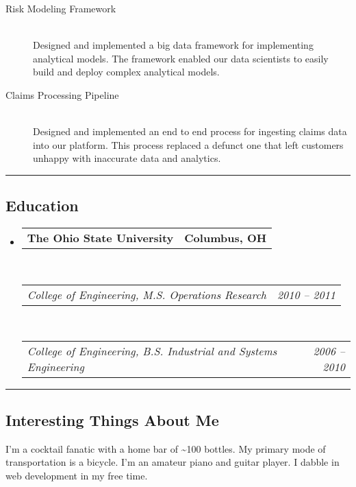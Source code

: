 \documentclass[10pt,letterpaper]{article}
\makeatletter
\newenvironment{indentsection}[1]%
{\begin{list}{}%
	{\setlength{\leftmargin}{#1}}%
	\item[]%
}
{\end{list}}
\newcommand{\headerrow}[2]
{\begin{tabular*}{\linewidth}{l@{\extracolsep{\fill}}r}
	#1 &
	#2 \\
\end{tabular*}}
\makeatother
\begin{document}
\begin{itemize}
\begin{description}
		\item[Risk Modeling Framework] \hfill \\
		Designed and implemented a big data framework for implementing analytical models.  The framework enabled our data scientists to easily build and deploy complex analytical models.
		\item[Claims Processing Pipeline] \hfill \\
		Designed and implemented an end to end process for ingesting claims data into our platform.  This process replaced a defunct one that left customers unhappy with inaccurate data and analytics.
	\end{description}
\end{itemize}
\hrule
\vspace{-0.4em}
\subsection*{Education}
\begin{itemize}
	\parskip=0.1em
	\item 
	\headerrow
		{\textbf{The Ohio State University}}
		{\textbf{Columbus, OH}}
	\\
	\headerrow
		{\emph{College of Engineering, M.S. Operations Research}}
		{\emph{2010 -- 2011}}
	\\
	\headerrow
		{\emph{College of Engineering, B.S. Industrial and Systems Engineering}}
		{\emph{2006 -- 2010}}
\end{itemize}
\hrule
\vspace{-0.4em}
\subsection*{Interesting Things About Me}
\begin{indentsection}{\parindent}
I'm a cocktail fanatic with a home bar of \textasciitilde 100 bottles.  My primary mode of transportation is a bicycle.  I'm an amateur piano and guitar player.  I dabble in web development in my free time.
\end{indentsection}
\end{document}
